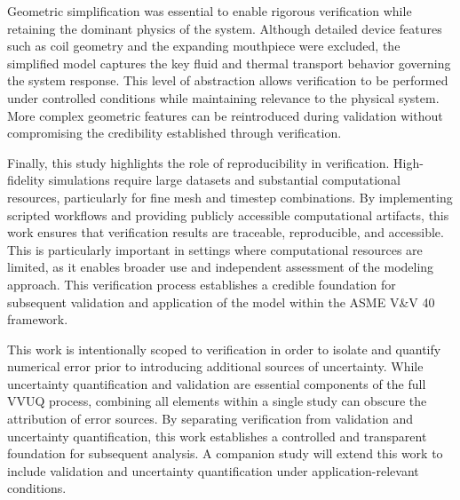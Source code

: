 Geometric simplification was essential to enable rigorous verification while retaining the dominant physics of the system. Although detailed device features such as coil geometry and the expanding mouthpiece were excluded, the simplified model captures the key fluid and thermal transport behavior governing the system response. This level of abstraction allows verification to be performed under controlled conditions while maintaining relevance to the physical system. More complex geometric features can be reintroduced during validation without compromising the credibility established through verification.

Finally, this study highlights the role of reproducibility in verification. High-fidelity simulations require large datasets and substantial computational resources, particularly for fine mesh and timestep combinations. By implementing scripted workflows and providing publicly accessible computational artifacts, this work ensures that verification results are traceable, reproducible, and accessible. This is particularly important in settings where computational resources are limited, as it enables broader use and independent assessment of the modeling approach. This verification process establishes a credible foundation for subsequent validation and application of the model within the ASME V\&V 40 framework. 

This work is intentionally scoped to verification in order to isolate and quantify numerical error prior to introducing additional sources of uncertainty. While uncertainty quantification and validation are essential components of the full VVUQ process, combining all elements within a single study can obscure the attribution of error sources. By separating verification from validation and uncertainty quantification, this work establishes a controlled and transparent foundation for subsequent analysis. A companion study will extend this work to include validation and uncertainty quantification under application-relevant conditions.


